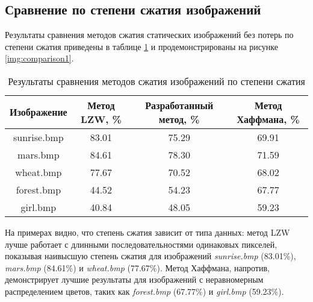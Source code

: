 \subsection{Сравнение по степени сжатия изображений}

Результаты сравнения методов сжатия статических изображений без потерь по степени сжатия приведены в таблице \ref{tbl:compression_ratio} и продемонстрированы на рисунке \ref{img:comparison1}.
\captionsetup{justification=raggedleft,singlelinecheck=false}
\begin{table}[H]
    \centering
        \caption{Результаты сравнения методов сжатия изображений по степени сжатия}
        \label{tbl:compression_ratio}
        \begin{tabular}{|c|c|c|c|}
            \hline
            \textbf{Изображение}
            & \begin{minipage}[t]{4cm}\centering\textbf{Метод LZW, \%}\end{minipage} 
            & \begin{minipage}[t]{4cm}\centering\textbf{Разработанный метод, \%}\end{minipage}
            & \begin{minipage}[t]{4cm}\centering\textbf{Метод Хаффмана, \%}\end{minipage} \\ \hline
            sunrise.bmp &  83.01  &  75.29  &  69.91  \\ \hline
            mars.bmp    &  84.61  &  78.30  &  71.59  \\ \hline
            wheat.bmp   &  77.67  &  70.52  &  68.02  \\ \hline
            forest.bmp  &  44.52  &  54.23  &  67.77  \\ \hline
            girl.bmp    &  40.84  &  48.05  &  59.23  \\ \hline
        \end{tabular}
\end{table}


На примерах видно, что степень сжатия зависит от типа данных: метод LZW лучше работает с длинными последовательностями одинаковых пикселей, показывая наивысшую степень сжатия для изображений \textit{sunrise.bmp} (83.01\%), \textit{mars.bmp} (84.61\%) и \textit{wheat.bmp} (77.67\%). Метод Хаффмана, напротив, демонстрирует лучшие результаты для изображений с неравномерным распределением цветов, таких как \textit{forest.bmp} (67.77\%) и \textit{girl.bmp} (59.23\%).

